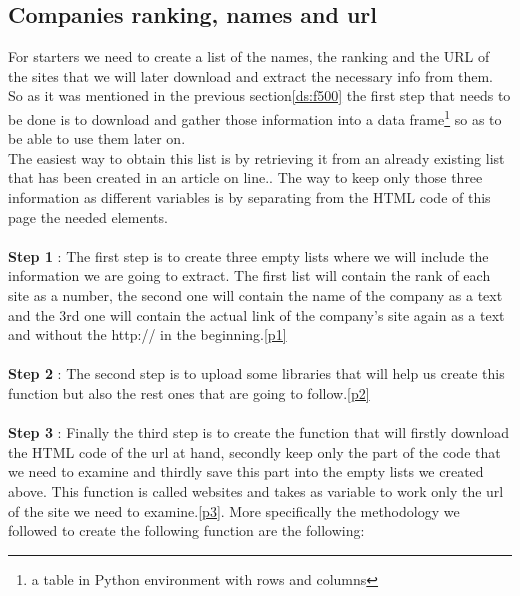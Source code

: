 \documentclass{book}
\begin{document}
\subsection{Companies ranking, names and url}
For starters we need to create a list of the names, the ranking and the URL of the sites that we will later download and extract the necessary info from them. So as it was mentioned in the previous section\ref{ds:f500} the first step that needs to be done is to download and gather those information into a data frame\footnote{a table in Python environment with rows and columns} so as to be able to use them later on.\\
The easiest way to obtain this list is by retrieving it from an already existing list that has been created in an article on line.\cite{key33}. The way to keep only those three information as different variables is by separating from the HTML code of this page the needed elements.\\\\
\textbf{Step 1} : The first step is to create three empty lists where we will include the information we are going to extract. The first list will contain the rank of each site as a number, the second one will contain the name of the company as a text and the 3rd one will contain the actual link of the company's site again as a text and without the http:// in the beginning.\ref{p1}\\\\
\textbf{Step 2} : The second step is to upload some libraries that will help us create this function but also the rest ones that are going to follow.\ref{p2}\\\\
\textbf{Step 3} : Finally the third step is to create the function that will firstly download the HTML code of the url at hand, secondly keep only the part of the code that we need to examine and thirdly save this part into the empty lists we created above. This function is called websites and takes as variable to work only the url of the site we need to examine.\ref{p3}. More specifically the methodology we followed to create the following function are the following:
\end{document}
